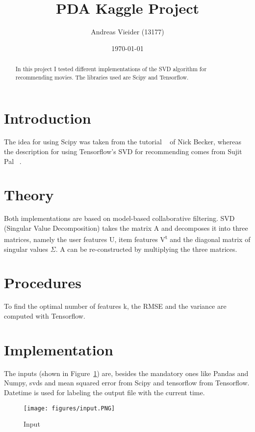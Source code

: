 \documentclass[letterpaper,12pt]{article}
\begin{document}
\title{PDA Kaggle Project}
\author{Andreas Vieider (13177)}
\date{\today}
\maketitle

\begin{abstract}
In this project I tested different implementations of the SVD algorithm for recommending movies. 
The libraries used are Scipy and Tensorflow.
\end{abstract}


\section{Introduction}
The idea for using Scipy was taken from the tutorial ~\cite{Scipy} of Nick Becker, whereas the description for using 
Tensorflow's SVD for recommending comes from Sujit Pal ~\cite{Tensorflow}.



\section{Theory}
Both implementations are based on model-based collaborative filtering. SVD (Singular Value Decomposition) takes the matrix A and decomposes it into three matrices, namely the user features U, item features V\textsuperscript{t} and the diagonal matrix of singular values \( \Sigma \). A can be re-constructed by multiplying the three matrices.



\section{Procedures}
To find the optimal number of features k, the RMSE and the variance are computed with Tensorflow.


\section{Implementation}
The inputs (shown in Figure~\ref{fig:input}) are, besides the mandatory ones like Pandas and Numpy, svds and mean squared error from Scipy and tensorflow from Tensorflow.
Datetime is used for labeling the output file with the current time.

\begin{figure}[H] 
  \centering
      \texttt{[image: figures/input.PNG]}
        \caption{
                \label{fig:input}  
                Input
        }
\end{figure}
\end{document}
